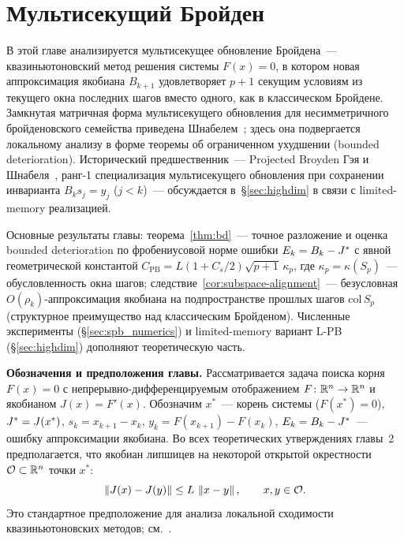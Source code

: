 \chapter{Мультисекущий Бройден}\label{ch:sp-broyden-theory}

В этой главе анализируется мультисекущее обновление Бройдена~---
квазиньютоновский метод решения системы $F(x)=0$, в котором новая
аппроксимация якобиана $B_{k+1}$ удовлетворяет $p+1$ секущим условиям
из текущего окна последних шагов вместо одного, как в классическом
Бройдене. Замкнутая матричная форма мультисекущего обновления для
несимметричного бройденовского семейства приведена
Шнабелем~\cite{schnabel1983}; здесь она подвергается локальному анализу
в форме теоремы об ограниченном ухудшении (bounded deterioration).
Исторический предшественник~--- Projected Broyden Гэя и
Шнабеля~\cite{gay_schnabel1978}, ранг-1 специализация мультисекущего
обновления при сохранении инварианта $B_k s_j = y_j$ ($j<k$)~---
обсуждается в~\S\ref{sec:highdim} в связи с limited-memory реализацией.

Основные результаты главы:
теорема~\ref{thm:bd}~--- точное разложение и оценка bounded
deterioration по фробениусовой норме ошибки $E_k = B_k - J^{*}$
с явной геометрической константой $C_{\mathrm{PB}} = L(1+C_s/2)\sqrt{p+1}\,\kappa_p$,
где $\kappa_p = \kappa(S_p)$~--- обусловленность окна шагов;
следствие~\ref{cor:subspace-alignment}~--- безусловная
$O(\rho_k)$-аппроксимация якобиана на подпространстве прошлых шагов
$\mathrm{col}\,S_p$ (структурное преимущество над классическим
Бройденом). Численные эксперименты (\S\ref{sec:spb_numerics}) и
limited-memory вариант L-PB (\S\ref{sec:highdim}) дополняют
теоретическую часть.

\noindent\textbf{Обозначения и предположения главы.}\enskip
Рассматривается задача поиска корня $F(x) = 0$ с
непрерывно-дифференцируемым отображением $F\colon\mathbb{R}^n \to \mathbb{R}^n$
и якобианом $J(x) = F'(x)$. Обозначим $x^*$~--- корень системы
($F(x^*) = 0$), $J^{*} = J(x^*)$, $s_k = x_{k+1} - x_k$,
$y_k = F(x_{k+1}) - F(x_k)$, $E_k = B_k - J^{*}$~--- ошибку
аппроксимации якобиана. Во всех теоретических утверждениях
главы~2 предполагается, что якобиан липшицев на некоторой открытой
окрестности $\mathcal{O} \subset \mathbb{R}^n$ точки $x^*$:
\begin{equation}\label{eq:lipschitz}
  \left\|J(x) - J(y)\right\| \le L\,\left\|x - y\right\|,
  \qquad x, y \in \mathcal{O}.
\end{equation}
Это стандартное предположение для анализа локальной сходимости
квазиньютоновских методов; см.~\cite{dennis1977,dennis1996}.

